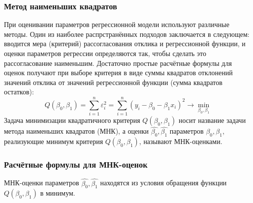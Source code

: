 \documentclass[12pt]{article}
\begin{document}
	\subsubsection{Метод наименьших квадратов}
	При оценивании параметров регрессионной модели используют различные методы. Один из наиболее распрстранённых подходов заключается в следующем: вводится мера (критерий) рассогласования отклика и регрессионной функции, и оценки параметров регрессии определяются так, чтобы сделать это рассогласование наименьшим. Достаточно простые расчётные формулы для оценок получают при выборе критерия в виде суммы квадратов отклонений значений отклика от значений регрессионной функции (сумма квадратов остатков):
	\begin{equation}
		Q(\beta_{0}, \beta_{1}) = \sum_{i=1}^{n}{\varepsilon_{i}^{2}} = 
		\sum_{i=1}^{n}{(y_{i} - \beta_{0} - \beta_{1}x_{i})^{2}}\rightarrow \min_{\beta_{0}, \beta_{1}}
		\label{Q_beta}
	\end{equation}
	Задача минимизации квадратичного критерия $Q(\beta_0, \beta_1)$ носит название задачи метода наименьших квадратов (МНК), а оценки $\hat{\beta_0}, \hat{\beta_1}$ параметров $\beta_0, \beta_1$, реализующие минимум критерия $Q(\beta_0, \beta_1)$, называют МНК-оценками. 
	
	\subsubsection{Расчётные формулы для МНК-оценок}
	МНК-оценки параметров $\hat{\beta_0}, \hat{\beta_1}$ находятся из условия обращения функции $Q(\beta_0, \beta_1)$ в минимум. 
	
\end{document}
